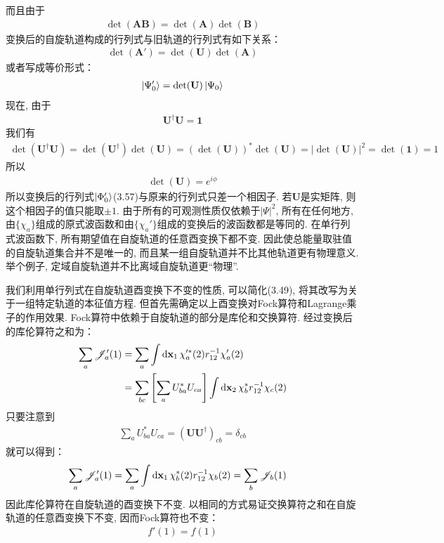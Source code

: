 而且由于
\begin{align}
\det(\mathbf{AB}) = \det(\mathbf{A})\det(\mathbf{B})
\end{align}
变换后的自旋轨道构成的行列式与旧轨道的行列式有如下关系：
\begin{align}
\det(\mathbf{A}') = \det(\mathbf{U})\det(\mathbf{A})
\end{align}
或者写成等价形式：
\begin{align}
\Ket{\Psi_0'} = \det(\mathbf{U})\Ket{\Psi_0}
\end{align}
现在, 由于
\begin{align}
\mathbf{U}^\dagger\mathbf{U} = \mathbf{1}
\end{align}
我们有
\begin{align}
\det(\mathbf{U}^\dagger\mathbf{U}) = \det(\mathbf{U}^\dagger)\det(\mathbf{U}) = (\det(\mathbf{U}))^*\det(\mathbf{U}) = |\det(\mathbf{U})|^2 = \det(\mathbf{1}) = 1
\end{align}
所以
\begin{align}
\det(\mathbf{U}) = e^{i\phi}
\end{align}
所以变换后的行列式$\Ket{\Phi_0'}$(3.57)与原来的行列式只差一个相因子. 若$\mathbf{U}$是实矩阵, 则这个相因子的值只能取$\pm 1$. 由于所有的可观测性质仅依赖于$|\Psi|^2$, 所有在任何地方, 由$\{\chi_a\}$组成的原式波函数和由$\{\chi_a'\}$组成的变换后的波函数都是等同的. 在单行列式波函数下, 所有期望值在自旋轨道的任意酉变换下都不变. 因此使总能量取驻值的自旋轨道集合并不是唯一的, 而且某一组自旋轨道并不比其他轨道更有物理意义. 举个例子, 定域自旋轨道并不比离域自旋轨道更“物理”.

我们利用单行列式在自旋轨道酉变换下不变的性质, 可以简化(3.49), 将其改写为关于一组特定轨道的本征值方程. 但首先需确定以上酉变换对Fock算符和Lagrange乘子的作用效果. Fock算符中依赖于自旋轨道的部分是库伦和交换算符. 经过变换后的库伦算符之和为：
\begin{align}
\sum_a \scr{J}_a'(1) & = \sum_a\int\dd{x}_1\,\chi_a^{\prime*}(2)\twoe\chi_a'(2)\notag\\
                     & = \sum_{bc}\left[ \sum_a U_{ba}^* U_{ca}\right]\int\dd{x}_2\,\chi_b^*\twoe\chi_c(2)
\end{align}
只要注意到
\begin{align}
\sum_a U_{ba}^* U_{ca} = (\mathbf{UU}^\dagger)_{cb} = \delta_{cb}
\end{align}
就可以得到：
\begin{align}
\sum_a \scr{J}_a'(1) & = \sum_a\int\dd{x}_1\,\chi_b^{*}(2)\twoe\chi_b(2) = \sum_{b}\scr{J}_b(1)
\end{align}
因此库伦算符在自旋轨道的酉变换下不变. 以相同的方式易证交换算符之和在自旋轨道的任意酉变换下不变, 因而Fock算符也不变：
\begin{align}
f'(1) = f(1)
\end{align}

